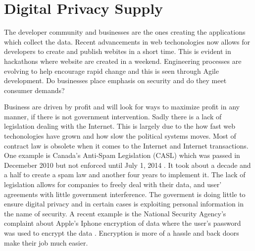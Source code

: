 \documentclass[12pt]{article}
\begin{document}
\section{Digital Privacy Supply}\label{sec:supply}

The developer community and businesses are the ones creating the applications which collect the data. Recent advancements in web techonologies now allows for developers to create and publish webites in a short time. This is evident in hackathons where website are created in a weekend. Engineering processes are evolving to help encourage rapid change and this is seen through Agile development. Do businesses place emphasis on security and do they meet consumer demands?

Business are driven by profit and will look for ways to maximize profit in any manner, if there is not government intervention. Sadly there is a lack of legislation dealing with the Internet. This is largely due to the how fast web techonologies have grown and how slow the political systems moves. Most of contract law is obsolete when it comes to the Internet and Internet transactions. One example is Canada's Anti-Spam Legislation (CASL) which was passed in Decemeber 2010 but not enforced until July 1, 2014 \cite{FastFacts}. It took about a decade and a half to create a spam law and another four years to implement it. The lack of legislation allows for companies to freely deal with their data, and user' agreements with little government interference. The goverment is doing little to ensure digital privacy and in certain cases is exploiting personal information in the name of security. A recent example is the National Security Agency's complaint about Apple's Iphone encryption of data where the user's password was used to encrypt the data \cite{Schneier}. Encryption is more of a hassle and back doors make their job much easier.
\end{document}
